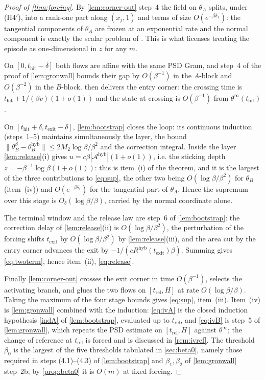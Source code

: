 \documentclass[11pt]{article}
\theoremstyle{definition}
\theoremstyle{remark}
\newcommand{\hyb}{\mathrm{hyb}}
\newcommand{\thit}{t_{\mathrm{hit}}}
\newcommand{\texit}{t_{\mathrm{exit}}}
\newcommand{\trel}{t_{\mathrm{rel}}}
\newcommand{\Ar}{\mathcal{A}}
\begin{document}
\begin{proof}[Proof of \cref{thm:forcing}]
By \cref{lem:corner-out} step~4 the field on $\theta_A$ splits, under (H4$'$),
into a rank-one part along $(x_j,1)$ and terms of size $O(e^{-\beta\delta_1})$:
the tangential components of $\theta_A$ are frozen at an exponential rate and
the normal component is exactly the scalar problem of
. This is what licenses treating the episode
as one-dimensional in $z$ for any $m$.

On $[0,\thit-\delta]$ both flows are affine with the same PSD Gram, and step~4 of
the proof of \cref{lem:gronwall} bounds their gap by $O(\beta^{-1})$ in the
$A$-block and $O(\beta^{-2})$ in the $B$-block.  then
delivers the entry corner: the crossing time is $\thit+1/(\beta v)(1+o(1))$ and
the state at crossing is $O(\beta^{-1})$ from $\theta^\infty(\thit)$.

On $[\thit+\delta,\texit-\delta]$, \cref{lem:bootstrap} closes the loop: its
continuous induction (steps~1--5) maintains simultaneously the layer, the bound
$\|\theta_B^\beta-\theta_B^{\hyb}\|\le2M_2\log\beta/\beta^2$ and the correction
integral. Inside the layer \cref{lem:release}(i) gives
$u=c\beta|\Ar^{\hyb}|(1+o(1))$, i.e. the sticking depth
$z=-\beta^{-1}\log\beta(1+o(1))$: this is item~(i) of the theorem, and it is the
largest of the three contributions to \eqref{eq:sup}, the other two being
$O(\log\beta/\beta^2)$ for $\theta_B$ (item~(iv)) and $O(e^{-\beta\delta_1})$ for
the tangential part of $\theta_A$. Hence the supremum over this stage is
$O_\delta(\log\beta/\beta)$, carried by the normal coordinate alone.

The terminal window and the release law are step~6 of \cref{lem:bootstrap}: the
correction delay of \cref{lem:release}(ii) is $O(\log\beta/\beta^2)$, the
perturbation of the forcing shifts $\texit$ by $O(\log\beta/\beta^2)$ by
\cref{lem:release}(iii), and the area cut by the entry corner advances the exit
by $-1/(cR^{\hyb}(\texit)\beta)$. Summing gives \eqref{eq:twoterm}, hence
item~(ii), \eqref{eq:release}.

Finally \cref{lem:corner-out} crosses the exit corner in time $O(\beta^{-1})$,
selects the activating branch, and glues the two flows on $[\trel,H]$ at rate
$O(\log\beta/\beta)$. Taking the maximum of the four stage bounds gives
\eqref{eq:sup}, item~(iii). Item~(iv) is \cref{lem:gronwall} combined with the
induction: \eqref{eq:ivA} is the closed induction hypothesis \eqref{indA} of
\cref{lem:bootstrap}, evaluated up to $\trel$, and \eqref{eq:ivB} is step~5 of
\cref{lem:gronwall}, which repeats the PSD estimate on $[\trel,H]$ against
$\theta^\infty$; the change of reference at $\trel$ is forced and is discussed in
\cref{rem:ivref}. The threshold $\beta_0$ is the largest of the five thresholds
tabulated in \cref{sec:beta0}, namely those required in steps (4.1)--(4.3) of
\cref{lem:bootstrap} and $\beta_1,\beta_2$ of \cref{lem:gronwall} step~2b; by
\cref{prop:beta0} it is $O(m)$ at fixed forcing.
\end{proof}
\end{document}

